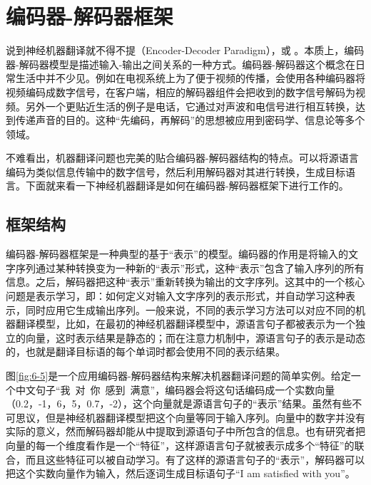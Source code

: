 
\sectionnewpage
\section{编码器-解码器框架}

\parinterval 说到神经机器翻译就不得不提{\small{}}（Encoder-Decoder Paradigm），或{\small{}} 。本质上，编码器-解码器模型是描述输入-输出之间关系的一种方式。编码器-解码器这个概念在日常生活中并不少见。例如在电视系统上为了便于视频的传播，会使用各种编码器将视频编码成数字信号，在客户端，相应的解码器组件会把收到的数字信号解码为视频。另外一个更贴近生活的例子是电话，它通过对声波和电信号进行相互转换，达到传递声音的目的。这种``先编码，再解码''的思想被应用到密码学、信息论等多个领域。

\parinterval 不难看出，机器翻译问题也完美的贴合编码器-解码器结构的特点。可以将源语言编码为类似信息传输中的数字信号，然后利用解码器对其进行转换，生成目标语言。下面就来看一下神经机器翻译是如何在编码器-解码器框架下进行工作的。


\subsection{框架结构}
\parinterval  编码器-解码器框架是一种典型的基于``表示''的模型。编码器的作用是将输入的文字序列通过某种转换变为一种新的``表示''形式，这种``表示''包含了输入序列的所有信息。之后，解码器把这种``表示''重新转换为输出的文字序列。这其中的一个核心问题是表示学习，即：如何定义对输入文字序列的表示形式，并自动学习这种表示，同时应用它生成输出序列。一般来说，不同的表示学习方法可以对应不同的机器翻译模型，比如，在最初的神经机器翻译模型中，源语言句子都被表示为一个独立的向量，这时表示结果是静态的；而在注意力机制中，源语言句子的表示是动态的，也就是翻译目标语的每个单词时都会使用不同的表示结果。

\parinterval  图\ref{fig:6-5}是一个应用编码器-解码器结构来解决机器翻译问题的简单实例。给定一个中文句子``我\ 对\ 你\ 感到\ 满意''，编码器会将这句话编码成一个实数向量（0.2，-1，6，5，0.7，-2），这个向量就是源语言句子的``表示''结果。虽然有些不可思议，但是神经机器翻译模型把这个向量等同于输入序列。向量中的数字并没有实际的意义，然而解码器却能从中提取到源语句子中所包含的信息。也有研究者把向量的每一个维度看作是一个``特征''，这样源语言句子就被表示成多个``特征''的联合，而且这些特征可以被自动学习。有了这样的源语言句子的``表示''，解码器可以把这个实数向量作为输入，然后逐词生成目标语句子``I am satisfied with you''。

